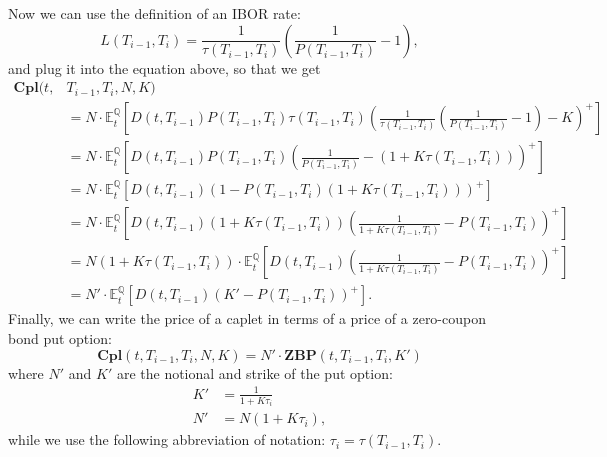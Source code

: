 \documentclass[titlepage, 12pt]{article}
\newcommand{\condexpect}[3]{\mathbb{E}^\mathbb{#1}_{#2}\left[#3\right]}
\begin{document}
	Now we can use the definition of an IBOR rate:
	\begin{equation}
		L(T_{i-1},T_i)=\frac{1}{\tau(T_{i-1}, T_i)}\left( \frac{1}{P(T_{i-1},T_i)} - 1 \right),
	\end{equation}
	and plug it into the equation above, so that we get
	\begin{equation}
		\begin{split}
			\mathbf{Cpl}(t,&T_{i-1},T_i,N,K) \\ &=N\cdot\condexpect{Q}{t}{D(t,T_{i-1})P(T_{i-1},T_i) \tau(T_{i-1},T_{i})\left(\frac{1}{\tau(T_{i-1}, T_i)}\left( \frac{1}{P(T_{i-1},T_i)} - 1 \right)-K\right)^+} \\
			&= N\cdot\condexpect{Q}{t}{D(t,T_{i-1})P(T_{i-1},T_i) \left( \frac{1}{P(T_{i-1},T_i)} - (1 +K\tau(T_{i-1},T_{i}))\right)^+} \\
			&= N\cdot\condexpect{Q}{t}{D(t,T_{i-1})\left(1 - P(T_{i-1},T_i)(1 +K\tau(T_{i-1},T_{i}))\right)^+} \\
			&= N\cdot\condexpect{Q}{t}{D(t,T_{i-1})(1 +K\tau(T_{i-1},T_{i}))\left(\frac{1}{1 +K\tau(T_{i-1},T_{i})} - P(T_{i-1},T_i)\right)^+} \\
			&= N(1 +K\tau(T_{i-1},T_{i}))\cdot\condexpect{Q}{t}{D(t,T_{i-1})\left(\frac{1}{1 +K\tau(T_{i-1},T_{i})} - P(T_{i-1},T_i)\right)^+} \\
			&= N'\cdot\condexpect{Q}{t}{D(t,T_{i-1})\left(K' - P(T_{i-1},T_i)\right)^+}.
		\end{split}
	\end{equation}
	Finally, we can write the price of a caplet in terms of a price of a zero-coupon bond put option:
	\begin{equation}
		\mathbf{Cpl}(t,T_{i-1},T_i,N,K) = N'\cdot\mathbf{ZBP}(t,T_{i-1},T_i,K')
	\end{equation}
	where $N'$ and $K'$ are the notional and strike of the put option:
	\begin{equation}
		\begin{split}
			K' &= \frac{1}{1+K\tau_i} \\
			N' &= N(1 +K\tau_i),
		\end{split}
	\end{equation}
	while we use the following abbreviation of notation: $\tau_i = \tau(T_{i-1}, T_i).$
	
\end{document}
